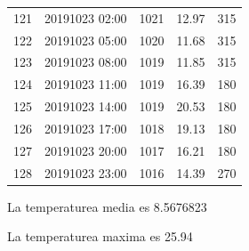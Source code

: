\documentclass{article}\usepackage[]{graphicx}\usepackage[]{color}
\begin{document}
\begin{tabular}{rllll}
  121 & 20191023 02:00 & 1021 & 12.97 & 315 \\ 
  122 & 20191023 05:00 & 1020 & 11.68 & 315 \\ 
  123 & 20191023 08:00 & 1019 & 11.85 & 315 \\ 
  124 & 20191023 11:00 & 1019 & 16.39 & 180 \\ 
  125 & 20191023 14:00 & 1019 & 20.53 & 180 \\ 
  126 & 20191023 17:00 & 1018 & 19.13 & 180 \\ 
  127 & 20191023 20:00 & 1017 & 16.21 & 180 \\ 
  128 & 20191023 23:00 & 1016 & 14.39 & 270 \\ 
   \hline
\end{tabular}



La temperaturea media es 8.5676823

La temperaturea maxima es 25.94
\end{document}
